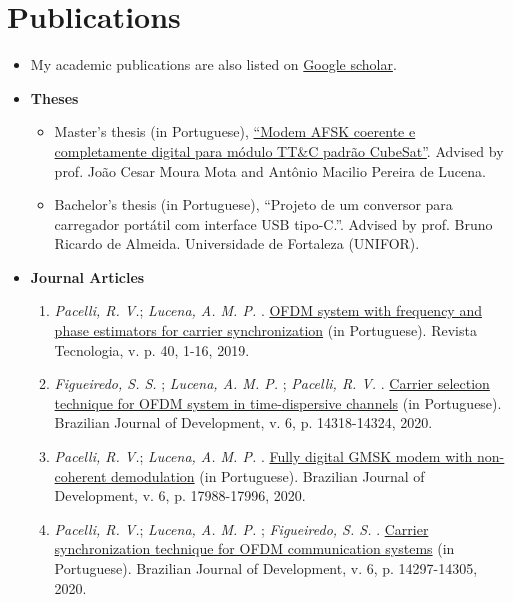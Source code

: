\section{Publications}

\begin{itemize}[leftmargin=0.15in, label={}] %
    \item My academic publications are also listed on \href{https://scholar.google.com.br/citations?user=Kj6Gzs4AAAAJ&hl=pt-BR&oi=sra}{Google scholar}.
    \item \textbf{Theses}
    \begin{itemize}%
        \item Master's thesis (in Portuguese), \href{http://repositorio.ufc.br/bitstream/riufc/60259/1/2021_dis_rvpacelli.pdf}{``Modem AFSK coerente e completamente digital para módulo TT\&C padrão CubeSat''}. Advised by prof. João Cesar Moura Mota and Antônio Macilio Pereira de Lucena.
        \item Bachelor's thesis (in Portuguese), ``Projeto de um conversor para carregador portátil com interface USB tipo-C.''. Advised by prof. Bruno Ricardo de Almeida. Universidade de Fortaleza (UNIFOR).
    \end{itemize}
    \item \textbf{Journal Articles}
    \begin{enumerate}[label=\textbf{J\arabic*.}, align=left, leftmargin=1.5cm]
        \item \textit{Pacelli, R. V.}; \textit{Lucena, A. M. P.} . \href{https://periodicos.unifor.br/tec/article/view/7506/5991}{OFDM system with frequency and phase estimators for carrier synchronization} (in Portuguese). Revista Tecnologia, v. p. 40, 1-16, 2019.
        \item \textit{Figueiredo, S. S.} ; \textit{Lucena, A. M. P.} ; \textit{Pacelli, R. V.} . \href{https://www.brazilianjournals.com/index.php/BRJD/article/view/7946/6889}{Carrier selection technique for OFDM system in time-dispersive channels} (in Portuguese). Brazilian Journal of Development, v. 6, p. 14318-14324, 2020.
        \item \textit{Pacelli, R. V.}; \textit{Lucena, A. M. P.} . \href{https://www.brazilianjournals.com/index.php/BRJD/article/view/8538/7345}{Fully digital GMSK modem with non-coherent demodulation} (in Portuguese). Brazilian Journal of Development, v. 6, p. 17988-17996, 2020.
        \item \textit{Pacelli, R. V.}; \textit{Lucena, A. M. P.} ; \textit{Figueiredo, S. S.} . \href{https://www.brazilianjournals.com/index.php/BRJD/article/view/7944/6883}{Carrier synchronization technique for OFDM communication systems} (in Portuguese). Brazilian Journal of Development, v. 6, p. 14297-14305, 2020.

\end{enumerate}
\end{itemize}

